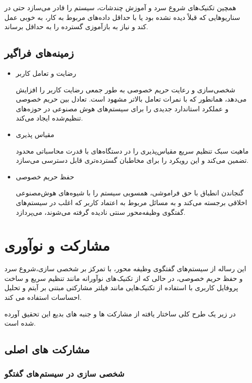 همچین تکنیک‌های شروع سرد و آموزش چندشات، سیستم را قادر می‌سازد حتی در سناریوهایی که قبلاً دیده نشده بود یا با حداقل داده‌های مربوط به کار، به خوبی عمل کند و نیاز به بازآموزی گسترده را به حداقل برساند.

\subsection{زمینه‌های فراگیر}

\begin{itemize}
\item
رضایت و تعامل کاربر

 شخصی‌سازی و رعایت حریم خصوصی به طور جمعی رضایت کاربر را افزایش می‌دهد، همانطور که با نمرات تعامل بالاتر مشهود است.
 تعادل بین حریم خصوصی و عملکرد استاندارد جدیدی را برای سیستم‌های هوش مصنوعی در حوزه‌های تنظیم‌شده ایجاد می‌کند.
\item
مقیاس پذیری

ماهیت سبک تنظیم سریع مقیاس‌پذیری را در دستگاه‌های با قدرت محاسباتی محدود تضمین می‌کند و این رویکرد را برای مخاطبان گسترده‌تری قابل دسترسی می‌سازد.
\item
حفظ حریم خصوصی

گنجاندن انطباق با حق فراموشی، همسویی سیستم را با شیوه‌های هوش‌مصنوعی اخلاقی برجسته می‌کند و به مسائل مربوط به اعتماد کاربر که اغلب در سیستم‌های گفتگوی وظیفه‌محور سنتی نادیده گرفته می‌شوند، می‌پردازد.
\end{itemize}

\section{مشارکت و نوآوری}
این رساله از سیستم‌های گفتگوی وظیفه محور، با تمرکز بر شخصی سازی،شروع سرد و حفظ حریم خصوصی، در حالی که از تکنیک های نوآورانه مانند تنظیم سریع و ساخت پروفایل کاربری با استفاده از تکنیک‌هایی مانند فیلتر مشارکتی مبتنی بر آیتم و تحلیل احساسات استفاده می کند.

در زیر یک طرح کلی ساختار یافته از مشارکت ها و جنبه های بدیع این تحقیق آورده شده است.

\subsection{مشارکت های اصلی}
\subsubsection{شخصی سازی در سیستم های گفتگو}



